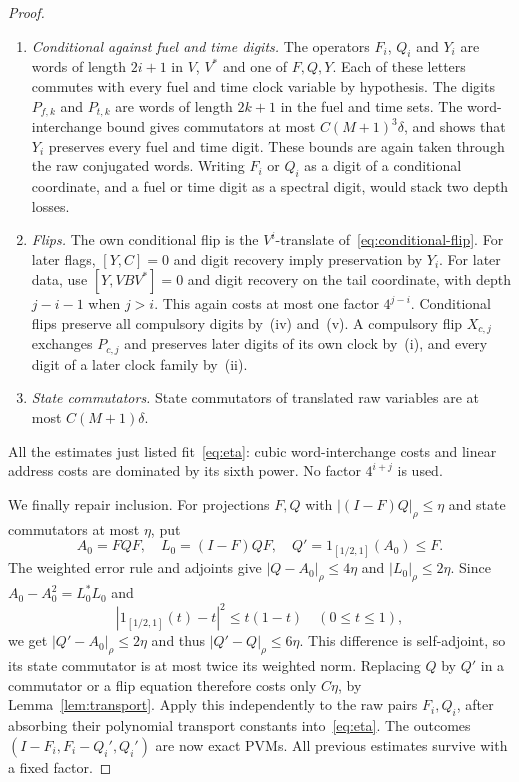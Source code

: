 \begin{proof}
\begin{enumerate}[label=(\roman*),leftmargin=*,itemsep=2pt]
\item \emph{Conditional against fuel and time digits.} The operators $F_i$, $Q_i$ and $Y_i$ are words of length $2i+1$ in $V$, $V^*$ and one of $F,Q,Y$. Each of these letters commutes with every fuel and time clock variable by hypothesis. The digits $P_{f,k}$ and $P_{t,k}$ are words of length $2k+1$ in the fuel and time sets. The word-interchange bound gives commutators at most $C(M+1)^3\delta$, and shows that $Y_i$ preserves every fuel and time digit. These bounds are again taken through the raw conjugated words. Writing $F_i$ or $Q_i$ as a digit of a conditional coordinate, and a fuel or time digit as a spectral digit, would stack two depth losses.
\item \emph{Flips.} The own conditional flip is the $V^i$-translate of~\eqref{eq:conditional-flip}. For later flags, $[Y,C]=0$ and digit recovery imply preservation by $Y_i$. For later data, use $[Y,VBV^*]=0$ and digit recovery on the tail coordinate, with depth $j-i-1$ when $j>i$. This again costs at most one factor $4^{j-i}$. Conditional flips preserve all compulsory digits by~(iv) and~(v). A compulsory flip $X_{c,j}$ exchanges $P_{c,j}$ and preserves later digits of its own clock by~(i), and every digit of a later clock family by~(ii).
\item \emph{State commutators.} State commutators of translated raw variables are at most $C(M+1)\delta$.
\end{enumerate}
All the estimates just listed fit~\eqref{eq:eta}: cubic word-interchange costs and linear address costs are dominated by its sixth power. No factor $4^{i+j}$ is used.

We finally repair inclusion. For projections $F,Q$ with $|(I-F)Q|_\rho\le\eta$ and state commutators at most $\eta$, put
\[
 A_0=FQF,\quad L_0=(I-F)QF,\quad Q'=1_{[1/2,1]}(A_0)\le F.
\]
The weighted error rule and adjoints give $|Q-A_0|_\rho\le4\eta$ and $|L_0|_\rho\le2\eta$. Since $A_0-A_0^2=L_0^*L_0$ and
\[
 |1_{[1/2,1]}(t)-t|^2\le t(1-t)\quad(0\le t\le1),
\]
we get $|Q'-A_0|_\rho\le2\eta$ and thus $|Q'-Q|_\rho\le6\eta$. This difference is self-adjoint, so its state commutator is at most twice its weighted norm. Replacing $Q$ by $Q'$ in a commutator or a flip equation therefore costs only $C\eta$, by Lemma~\ref{lem:transport}. Apply this independently to the raw pairs $F_i,Q_i$, after absorbing their polynomial transport constants into~\eqref{eq:eta}. The outcomes $(I-F_i,F_i-Q_i',Q_i')$ are now exact PVMs. All previous estimates survive with a fixed factor.
\end{proof}

